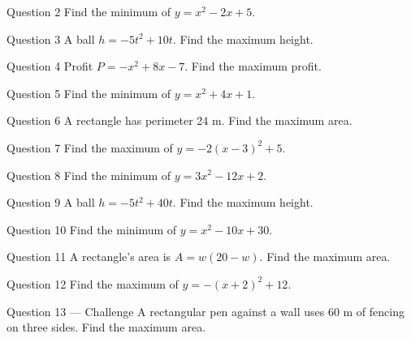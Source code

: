 \documentclass[11pt]{article}
\begin{document}
\begin{qbox}{Question 2}
Find the minimum of $y=x^2-2x+5$.\workspace{2.4cm}
\end{qbox}

\begin{qbox}{Question 3}
A ball $h=-5t^2+10t$. Find the maximum height.\workspace{2.4cm}
\end{qbox}

\begin{qbox}{Question 4}
Profit $P=-x^2+8x-7$. Find the maximum profit.\workspace{2.4cm}
\end{qbox}

\begin{qbox}{Question 5}
Find the minimum of $y=x^2+4x+1$.\workspace{2.4cm}
\end{qbox}

\begin{qbox}{Question 6}
A rectangle has perimeter 24 m. Find the maximum area.\workspace{2.4cm}
\end{qbox}

\begin{qbox}{Question 7}
Find the maximum of $y=-2(x-3)^2+5$.\workspace{2.4cm}
\end{qbox}

\begin{qbox}{Question 8}
Find the minimum of $y=3x^2-12x+2$.\workspace{2.4cm}
\end{qbox}

\begin{qbox}{Question 9}
A ball $h=-5t^2+40t$. Find the maximum height.\workspace{2.4cm}
\end{qbox}

\begin{qbox}{Question 10}
Find the minimum of $y=x^2-10x+30$.\workspace{2.4cm}
\end{qbox}

\begin{qbox}{Question 11}
A rectangle's area is $A=w(20-w)$. Find the maximum area.\workspace{2.4cm}
\end{qbox}

\begin{qbox}{Question 12}
Find the maximum of $y=-(x+2)^2+12$.\workspace{2.4cm}
\end{qbox}

\begin{qbox}{Question 13 --- Challenge}
A rectangular pen against a wall uses 60 m of fencing on three sides. Find the maximum area.\workspace{3.5cm}
\end{qbox}
\end{document}
